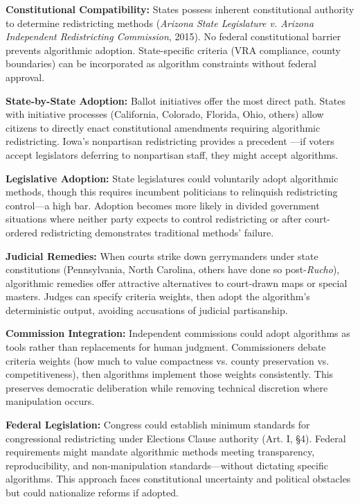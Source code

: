 \textbf{Constitutional Compatibility:} States possess inherent constitutional authority to determine redistricting methods (\textit{Arizona State Legislature v. Arizona Independent Redistricting Commission}, 2015). No federal constitutional barrier prevents algorithmic adoption. State-specific criteria (VRA compliance, county boundaries) can be incorporated as algorithm constraints without federal approval.

\textbf{State-by-State Adoption:} Ballot initiatives offer the most direct path. States with initiative processes (California, Colorado, Florida, Ohio, others) allow citizens to directly enact constitutional amendments requiring algorithmic redistricting. Iowa's nonpartisan redistricting provides a precedent \cite{deford2019implementing}—if voters accept legislators deferring to nonpartisan staff, they might accept algorithms.

\textbf{Legislative Adoption:} State legislatures could voluntarily adopt algorithmic methods, though this requires incumbent politicians to relinquish redistricting control—a high bar. Adoption becomes more likely in divided government situations where neither party expects to control redistricting or after court-ordered redistricting demonstrates traditional methods' failure.

\textbf{Judicial Remedies:} When courts strike down gerrymanders under state constitutions (Pennsylvania, North Carolina, others have done so post-\textit{Rucho}), algorithmic remedies offer attractive alternatives to court-drawn maps or special masters. Judges can specify criteria weights, then adopt the algorithm's deterministic output, avoiding accusations of judicial partisanship.

\textbf{Commission Integration:} Independent commissions could adopt algorithms as tools rather than replacements for human judgment. Commissioners debate criteria weights (how much to value compactness vs. county preservation vs. competitiveness), then algorithms implement those weights consistently. This preserves democratic deliberation while removing technical discretion where manipulation occurs.

\textbf{Federal Legislation:} Congress could establish minimum standards for congressional redistricting under Elections Clause authority (Art. I, §4). Federal requirements might mandate algorithmic methods meeting transparency, reproducibility, and non-manipulation standards—without dictating specific algorithms. This approach faces constitutional uncertainty and political obstacles but could nationalize reforms if adopted.

